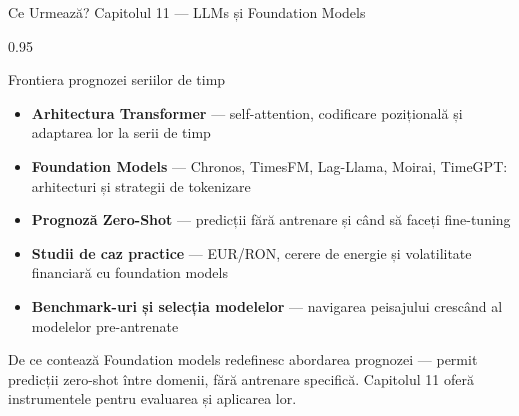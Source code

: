 \documentclass[9pt, aspectratio=169, t]{beamer}
\begin{document}

\begin{frame}{Ce Urmează? Capitolul 11 --- LLMs și Foundation Models}
    \begin{cminipage}{0.95\textwidth}
    \begin{block}{Frontiera prognozei seriilor de timp}
        \begin{itemize}\setlength{\itemsep}{2pt}
            \item[\textcolor{MainBlue}{\textbf{1.}}] \textbf{Arhitectura Transformer} --- self-attention, codificare pozițională și adaptarea lor la serii de timp
            \item[\textcolor{MainBlue}{\textbf{2.}}] \textbf{Foundation Models} --- Chronos, TimesFM, Lag-Llama, Moirai, TimeGPT: arhitecturi și strategii de tokenizare
            \item[\textcolor{MainBlue}{\textbf{3.}}] \textbf{Prognoză Zero-Shot} --- predicții fără antrenare și când să faceți fine-tuning
            \item[\textcolor{MainBlue}{\textbf{4.}}] \textbf{Studii de caz practice} --- EUR/RON, cerere de energie și volatilitate financiară cu foundation models
            \item[\textcolor{MainBlue}{\textbf{5.}}] \textbf{Benchmark-uri și selecția modelelor} --- navigarea peisajului crescând al modelelor pre-antrenate
        \end{itemize}
    \end{block}

    \begin{alertblock}{De ce contează}
        Foundation models redefinesc abordarea prognozei --- permit predicții zero-shot între domenii, fără antrenare specifică. Capitolul 11 oferă instrumentele pentru evaluarea și aplicarea lor.
    \end{alertblock}
    \end{cminipage}
\end{frame}
\end{document}
